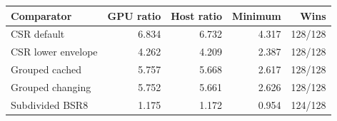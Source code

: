 \begin{tabular}{lrrrr}
\toprule
Comparator & GPU ratio & Host ratio & Minimum & Wins \\
\midrule
CSR default & 6.834 & 6.732 & 4.317 & 128/128 \\
CSR lower envelope & 4.262 & 4.209 & 2.387 & 128/128 \\
Grouped cached & 5.757 & 5.668 & 2.617 & 128/128 \\
Grouped changing & 5.752 & 5.661 & 2.626 & 128/128 \\
Subdivided BSR8 & 1.175 & 1.172 & 0.954 & 124/128 \\
\bottomrule
\end{tabular}
